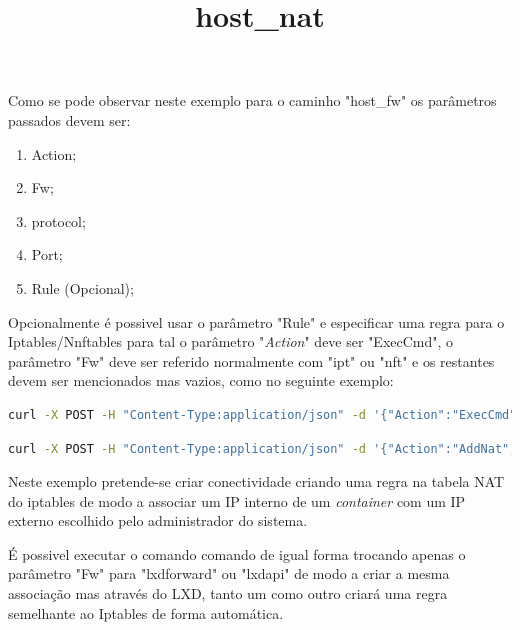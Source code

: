 Como se pode observar neste exemplo para o caminho "host\_fw" os parâmetros passados devem ser:

\begin{enumerate}
    \item Action;
    \item Fw;
    \item protocol;
    \item Port;
    \item Rule (Opcional);
\end{enumerate}

Opcionalmente é possivel usar o parâmetro "Rule" e especificar uma regra para o Iptables\slash Nnftables
para tal o parâmetro "\textit{Action}" deve ser "ExecCmd", o parâmetro "Fw" deve ser referido normalmente com "ipt" ou "nft" e os restantes devem ser mencionados mas vazios, como no seguinte exemplo:

\begin{lstlisting}[language=Bash, caption={Exemplo de solicitação para a firewal do sistema host com uma regra personalizada}]
    curl -X POST -H "Content-Type:application/json" -d '{"Action":"ExecCmd","Fw":"ipt","Protocol":"","Port":"", "Rule":"INPUT -s 192.168.1.140 -j DROP"}' http://localhost:5000/host_fw
\end{lstlisting}



\title*{\textbf{host\_nat}}

\begin{lstlisting}[language=Bash, caption={Exemplo de solicitação para a firewal do sistema host para associar um IP externo a umIp de container de modo a criar conectividade}]
    curl -X POST -H "Content-Type:application/json" -d '{"Action":"AddNat","Fw":"ipt","Protocol":"tcp","Port":"22","External_ip":"192.168.1.120","Container_internal_ip":"10.195.171.205","Container_internal_port":"80" }' http://localhost:5000/host_nat
\end{lstlisting}

Neste exemplo pretende-se criar conectividade criando uma regra na tabela NAT do iptables de modo a associar
um IP interno de um \textit{container} com um IP externo escolhido pelo administrador do sistema.

É possivel executar o comando comando de igual forma trocando apenas o parâmetro "Fw" para "lxdforward" 
ou "lxdapi" de modo a criar a mesma associação mas através do LXD, tanto um como outro criará uma regra
semelhante ao Iptables de forma automática.

